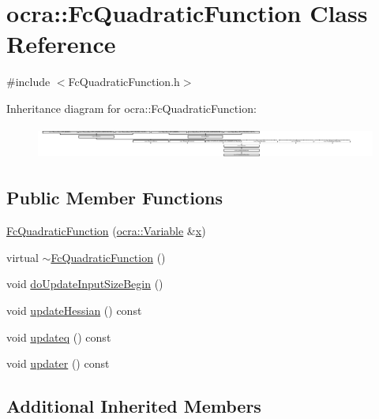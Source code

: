 \hypertarget{classocra_1_1FcQuadraticFunction}{}\section{ocra\+:\+:Fc\+Quadratic\+Function Class Reference}
\label{classocra_1_1FcQuadraticFunction}


{\ttfamily \#include $<$Fc\+Quadratic\+Function.\+h$>$}

Inheritance diagram for ocra\+:\+:Fc\+Quadratic\+Function\+:\begin{figure}[H]
\begin{center}
\leavevmode
\includegraphics[height=1.082126cm]{d3/d16/classocra_1_1FcQuadraticFunction}
\end{center}
\end{figure}
\subsection*{Public Member Functions}
\begin{DoxyCompactItemize}
\item 
\hyperlink{classocra_1_1FcQuadraticFunction_a85ee0d84a43b16353b1d44740cc3769b}{Fc\+Quadratic\+Function} (\hyperlink{classocra_1_1Variable}{ocra\+::\+Variable} \&\hyperlink{classocra_1_1Function_a28825886d1f149c87b112ec2ec1dd486}{x})
\item 
virtual \hyperlink{classocra_1_1FcQuadraticFunction_a1eef85d7638d6bfc0c2bb3bc9dab8d63}{$\sim$\+Fc\+Quadratic\+Function} ()
\item 
void \hyperlink{classocra_1_1FcQuadraticFunction_a1e350f138eb82cfe3e8cf049942e626c}{do\+Update\+Input\+Size\+Begin} ()
\item 
void \hyperlink{classocra_1_1FcQuadraticFunction_aef068bc86027f29c0fbfaa9d53441cd4}{update\+Hessian} () const
\item 
void \hyperlink{classocra_1_1FcQuadraticFunction_ac6bcfaccbe16a821e0f1d7c29744d138}{updateq} () const
\item 
void \hyperlink{classocra_1_1FcQuadraticFunction_aab41d4b011590ad42766e66df34305da}{updater} () const
\end{DoxyCompactItemize}
\subsection*{Additional Inherited Members}


